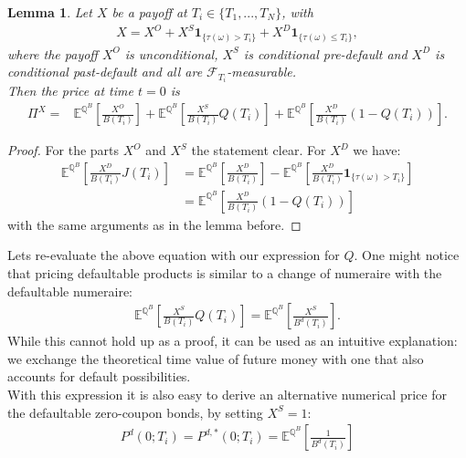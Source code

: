 \documentclass[12pt]{article}
\newtheorem{lemma}[theorem]{Lemma}
\begin{document}
	\begin{lemma}\label{lem:dependentondefaultandsurvial}
		Let $X$ be a payoff at $T_i \in \{T_1, ..., T_N\}$, with
		\begin{align*}
			X = X^O + X^S \mathbf{1}_{\{\tau(\omega) > T_i\}} + X^D \mathbf{1}_{\{\tau(\omega) \le T_i\}},
		\end{align*}
		where the payoff $X^O$ is unconditional, $X^S$ is conditional pre-default and $X^D$ is conditional past-default and all are  $\mathcal{F}_{T_i}$-measurable.\\
		Then the price at time $t=0$ is
		\begin{align*}
			\Pi^X =& \mathbb{E}^{\mathbb{Q}^B}\left[ \frac{X^O}{B(T_i)} \right]
			+\mathbb{E}^{\mathbb{Q}^B}\left[ \frac{X^S}{B(T_i)} Q(T_i) \right] + \mathbb{E}^{\mathbb{Q}^B}\left[ \frac{X^D}{B(T_i)} \left(1 - Q(T_i)\right) \right].
		\end{align*}
	\end{lemma}
	\begin{proof}
		For the parts $X^O$ and $X^S$ the statement clear. For $X^D$ we have:
		\begin{align*}
			\mathbb{E}^{\mathbb{Q}^B}\left[ \frac{X^D}{B(T_i)} J(T_i) \right]
			&= \mathbb{E}^{\mathbb{Q}^B}\left[ \frac{X^D}{B(T_i)}\right] - \mathbb{E}^{\mathbb{Q}^B}\left[ \frac{X^D}{B(T_i)} \mathbf{1}_{\{\tau(\omega) > T_i\}} \right]\\
			&=\mathbb{E}^{\mathbb{Q}^B}\left[ \frac{X^D}{B(T_i)} \left(1 - Q(T_i)\right) \right]
		\end{align*}
		with the same arguments as in the lemma before.
	\end{proof}
	Lets re-evaluate the above equation with our expression for $Q$. One might notice that pricing defaultable products is similar to a change of numeraire with the defaultable numeraire: 
	\begin{align}\label{eq:defaultableclaimvaluation}
		\mathbb{E}^{\mathbb{Q}^B}\left[ \frac{X^S}{B(T_i)} Q(T_i) \right] =
		\mathbb{E}^{\mathbb{Q}^B}\left[ \frac{X^S}{B^d(T_i)} \right].
	\end{align}
	While this cannot hold up as a proof, it can be used as an intuitive explanation: we exchange the theoretical time value of future money with one that also accounts for default possibilities.\\
	With this expression it is also easy to derive an alternative numerical price for the defaultable zero-coupon bonds, by setting $X^S=1$:
	\begin{align*}
		P^d(0;T_i) = P^{d,*}(0;T_i) = \mathbb{E}^{\mathbb{Q}^B}\left[ \frac{1}{B^d(T_i)} \right]
	\end{align*}
\end{document}
